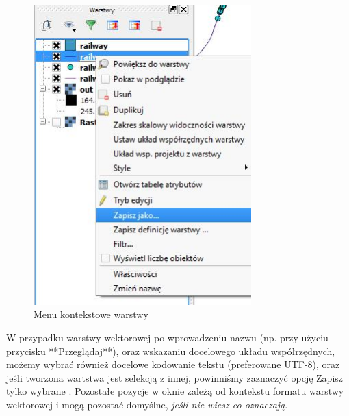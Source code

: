 \documentclass[12pt,a4paper]{book}
\begin{document}
\begin{center}
\begin{figure}
\includegraphics[width=8.435cm,height=11.557cm]{002-menu-kontekstowe.jpg}
\caption{Menu kontekstowe warstwy}
\end{figure}
\end{center}
W przypadku warstwy wektorowej po wprowadzeniu nazwu (np. przy użyciu przycisku **Przeglądaj**), oraz wskazaniu
docelowego układu współrzędnych, możemy wybrać również docelowe kodowanie tekstu (preferowane UTF-8), oraz jeśli tworzona wartstwa jest selekcją z innej, powinniśmy zaznaczyć opcję  Zapisz tylko wybrane . Pozostałe pozycje w oknie zależą od kontekstu formatu warstwy wektorowej i mogą pozostać domyślne, \textit{jeśli nie wiesz co oznaczają}.
\end{document}
